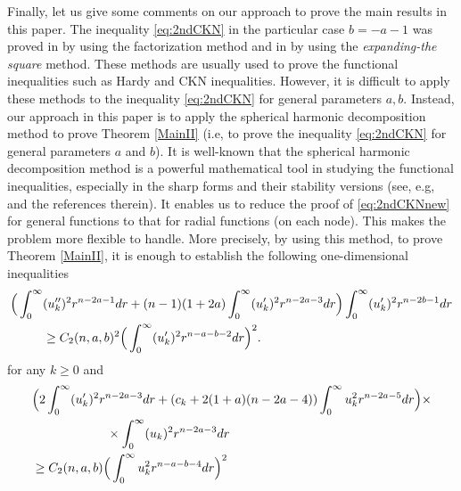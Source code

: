 \documentclass[a4paper,12pt]{article}
\theoremstyle{plain}
\theoremstyle{definition}
\theoremstyle{remark}
\numberwithin{equation}{section}
\begin{document}
Finally, let us give some comments on our approach to prove the main results in this paper. The inequality \eqref{eq:2ndCKN} in the particular case $b = -a -1$ was proved in \cite{DNAFM} by using the factorization method and in \cite{CFL22} by using the {\it expanding-the square} method. These methods are usually used to prove the functional inequalities such as Hardy and CKN inequalities. However,  it is difficult  to apply these methods to the inequality \eqref{eq:2ndCKN} for general parameters $a, b$. Instead, our approach in this paper is to apply the spherical harmonic decomposition method to prove Theorem \ref{MainII} (i.e, to prove the inequality \eqref{eq:2ndCKN} for general parameters $a$ and $b$). It is well-known that the spherical harmonic decomposition method is a powerful mathematical tool in studying the functional inequalities, especially in the sharp forms and their stability versions (see, e.g, \cite{TerZoAiM,DNCVPDE,DLL26,CFL22} and the references therein). It enables us to reduce the proof of \eqref{eq:2ndCKNnew} for general functions  to that  for radial functions (on each node). This  makes the problem more flexible to handle. More precisely, by using this method, to prove {Theorem \ref{MainII}},  it is enough to establish  the following one-dimensional inequalities 
\begin{align*}%
\Big(\int_0^\infty& (u_k'')^2r^{n-2a -1} dr+ (n-1)(1+2a) \int_0^\infty (u_k')^2 r^{n-2a -3} dr\Big) \int_0^\infty (u_k')^2 r^{n-2b -1} dr\notag\\
&\geq C_2(n,a,b)^2 \Big(\int_0^\infty (u_k')^2 r^{n - a -b -2} dr\Big)^2.
\end{align*}
for any $k\geq 0$ and
\begin{align*}%
&\Big(2\int_0^\infty (u_k')^2 r^{n-2a -3} dr + (c_k + 2(1+a)(n-2a -4))\int_0^\infty u_k^2 r^{n -2a -5} dr\Big) \times \notag\\
&\qquad\qquad\qquad \times \int_0^\infty (u_k)^2 r^{n-2a -3} dr\notag\\
&\geq C_2(n,a,b)\Big(\int_0^\infty u_k^2 r^{n -a -b-4} dr\Big)^2
\end{align*}
\end{document}
